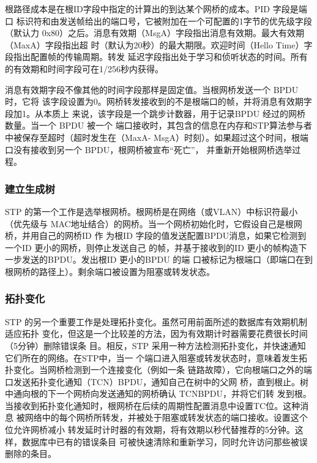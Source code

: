 根路径成本是在根ID字段中指定的计算出的到达某个网桥的成本。PID 字段是端口
标识符和由发送帧给出的端口号，它被附加在一个可配置的1字节的优先级字段（默认力
0x80）之后。消息有效期（MsgA）字段指出消息有效期。最大有效期（MaxA）字段指出超
时（默认为20秒）的最大期限。欢迎时间（Hello Time）字段指出配置帧的传输周期。转发
延迟字段指出处于学习和侦听状态的时间。所有的有效期和时间字段可在1/256秒内获得。

消息有效期字段不像其他的时间字段那样是固定值。当根网桥发送一个 BPDU时，它将
该字段设置为0。网桥转发接收到的不是根端口的帧，并将消息有效期字段加1。从本质上
来说，该字段是一个跳步计数器，用于记录BPDU 经过的网桥数量。当一个 BPDU 被一个
端口接收时，其包含的信息在内存和STP算法参与者中被保存至超时（超时发生在（MaxA-
MsgA）时刻）。如果超过这个时间，根端口没有接收到另一个 BPDU，根网桥被宣布“死亡”，
并重新开始根网桥选举过程。

\subsubsection{建立生成树}

STP 的第一个工作是选举根网桥。根网桥是在网络（或VLAN）中标识符最小（优先级与
MAC地址结合）的网桥。当一个网桥初始化时，它假设自己是根网桥，并用自己的网桥ID 作
为根ID 字段的值发送配置BPDU消息，如果它检测到一个ID 更小的网桥，则停止发送自己
的帧，并基于接收到的ID 更小的帧构造下一步发送的BPDU。发出根ID 更小的BPDU 的端
口被标记为根端口（即端口在到根网桥的路径上）。剩余端口被设置为阻塞或转发状态。

\subsubsection{拓扑变化}

STP 的另一个重要工作是处理拓扑变化。虽然可用前面所述的数据库有效期机制适应拓扑
变化，但这是一个比较差的方法，因为有效期计时器需要花费很长时间（5分钟）删除错误条
目。相反，STP 采用一种方法检测拓扑变化，并快速通知它们所在的网络。在STP中，当一
个端口进入阻塞或转发状态时，意味着发生拓扑变化。当网桥检测到一个连接变化（例如一条
链路故障），它向根端口之外的端口发送拓扑变化通知（TCN）BPDU，通知自己在树中的父网
桥，直到根止。树中通向根的下一个网桥向发送通知的网桥确认 TCNBPDU，并将它们转
发到根。当接收到拓扑变化通知时，根网桥在后续的周期性配置消息中设置TC位。这种消息
被网络中的每个网桥所转发，并被处于阻塞或转发状态的端口接收。设置这个位允许网桥减小
转发延时计时器的有效期，将有效期以秒代替推荐的5分钟。这样，数据库中已有的错误条目
可被快速清除和重新学习，同时允许访问那些被误删除的条目。

